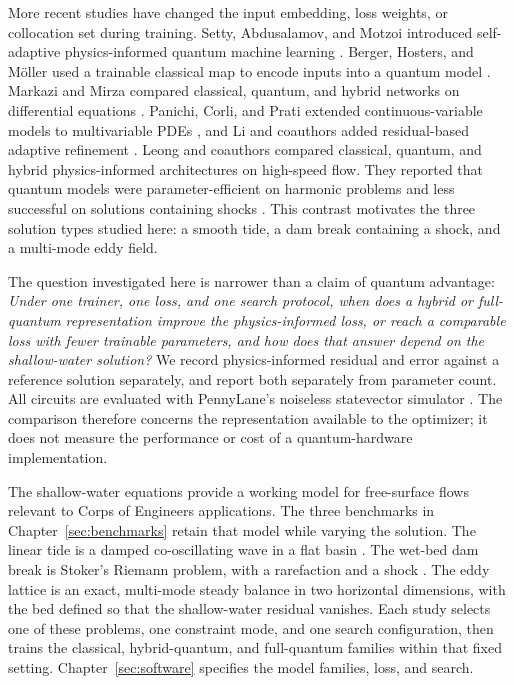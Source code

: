\documentclass{erdc}
\begin{document}
More recent studies have changed the input embedding, loss weights, or
collocation set during training. Setty, Abdusalamov, and Motzoi introduced
self-adaptive physics-informed quantum machine learning
\cite{setty2025selfadaptive}. Berger, Hosters, and M\"oller used a
trainable classical map to encode inputs into a quantum model
\cite{berger2025trainable}. Markazi and Mirza compared classical, quantum,
and hybrid networks on differential equations
\cite{markazi2025evaluating}. Panichi, Corli, and Prati extended
continuous-variable models to multivariable PDEs
\cite{panichi2026multivariable}, and Li and coauthors added residual-based
adaptive refinement \cite{li2026adaptive}. Leong and coauthors compared
classical, quantum, and hybrid physics-informed architectures on
high-speed flow. They reported that quantum models were parameter-efficient
on harmonic problems and less successful on solutions containing shocks
\cite{leong2025highspeed}. This contrast motivates the three solution
types studied here: a smooth tide, a dam break containing a shock, and a
multi-mode eddy field.

The question investigated here is narrower than a claim of quantum
advantage:
\emph{Under one trainer, one loss, and one search protocol, when does a
hybrid or full-quantum representation improve the physics-informed loss,
or reach a comparable loss with fewer trainable parameters, and how does
that answer depend on the shallow-water solution?}
We record physics-informed residual and error against a reference solution
separately, and report both separately from parameter count. All circuits
are evaluated with PennyLane's noiseless statevector simulator
\cite{bergholm2018pennylane}. The comparison therefore concerns the
representation available to the optimizer; it does not measure the
performance or cost of a quantum-hardware implementation.

The shallow-water equations provide a working model for free-surface flows
relevant to Corps of Engineers applications. The three benchmarks in
Chapter~\ref{sec:benchmarks} retain that model while varying the solution.
The linear tide is a damped co-oscillating wave in a flat basin
\cite{Dean1991}. The wet-bed dam break is Stoker's Riemann problem, with a
rarefaction and a shock \cite{Stoker1957,Delestre2013}. The eddy lattice
is an exact, multi-mode steady balance in two horizontal dimensions, with
the bed defined so that the shallow-water residual vanishes. Each study
selects one of these problems, one constraint mode, and one search
configuration, then trains the classical, hybrid-quantum, and full-quantum
families within that fixed setting. Chapter~\ref{sec:software} specifies
the model families, loss, and search.
\end{document}
